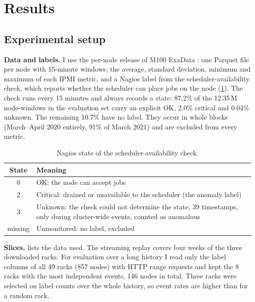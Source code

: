 \section{Results}
\label{sec:results}

\subsection{Experimental setup}
\label{sec:setup}
\textbf{Data and labels.} I use the per-node release of M100 ExaData \cite{borghesi2023m100}: one Parquet file per node with 15-minute windows, the average, standard deviation, minimum and maximum of each IPMI metric, and a Nagios label from the scheduler-availability check, which reports whether the scheduler can place jobs on the node (\cref{tab:nagios}). The check runs every 15 minutes and always records a state: 87.2\% of the 12.35\,M node-windows in the evaluation set carry an explicit OK, 2.0\% critical and 0.04\% unknown. The remaining 10.7\% have no label. They occur in whole blocks (March--April 2020 entirely, 91\% of March 2021) and are excluded from every metric.

\begin{table}[t]
\caption{Nagios state of the scheduler-availability check.}
\label{tab:nagios}
\centering\small
\begin{tabular}{cp{6.4cm}}
\toprule
State & Meaning \\
\midrule
0 & OK: the node can accept jobs \\
2 & Critical: drained or unavailable to the scheduler (the anomaly label) \\
3 & Unknown: the check could not determine the state; 39 timestamps, only during cluster-wide events, counted as anomalous \\
missing & Unmonitored: no label, excluded \\
\bottomrule
\end{tabular}
\end{table}

\textbf{Slices.}  lists the data used. The streaming replay covers four weeks of the three downloaded racks. For evaluation over a long history I read only the label columns of all 49 racks (857 nodes) with HTTP range requests and kept the 8 racks with the most independent events, 146 nodes in total. These racks were selected on label counts over the whole history, so event rates are higher than for a random rack.

